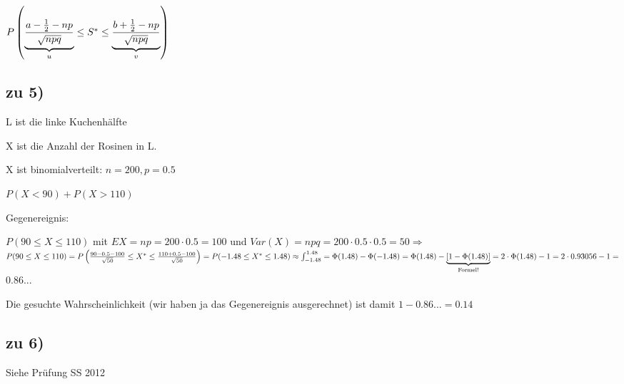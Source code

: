$P  \left( \underbrace{\frac{a - \frac{1}{2} - np}{\sqrt{npq}}}_{u} \leq S^* \leq \underbrace{\frac{b + \frac{1}{2} - np}{\sqrt{npq}}}_{v}  \right) $

\subsection{zu 5)}
L ist die linke Kuchenhälfte

X ist die Anzahl der Rosinen in L.

X ist binomialverteilt: $ n = 200, p=0.5 $

$ P(X < 90) + P(X > 110) $

Gegenereignis: 

$ P(90 \leq X \leq 110) $ mit $ EX = np = 200 \cdot 0.5 = 100 $ und $ Var(X) = npq = 200\cdot 0.5 \cdot 0.5 = 50 \Rightarrow $ 
$ P(90 \leq X \leq 110) 
= P \left( \frac{90 - 0.5 - 100}{\sqrt{50}} \leq X^* \leq \frac{110 + 0.5 - 100}{\sqrt{50}}  \right) 
= P(-1.48 \leq X^* \leq 1.48)
\approx \int_{-1.48}^{1.48} = \Phi(1.48) - \Phi(-1.48) 
= \Phi(1.48) - \underbrace{[1-\Phi(1.48)]}_{\textrm{Formel!}}
= 2 \cdot \Phi(1.48) -1 
= 2\cdot 0.93056 - 1 = $
\underline{$0.86...$}

Die gesuchte Wahrscheinlichkeit (wir haben ja das Gegenereignis ausgerechnet) ist damit $1-0.86...= 0.14$

\subsection{zu 6)}
Siehe Prüfung SS 2012